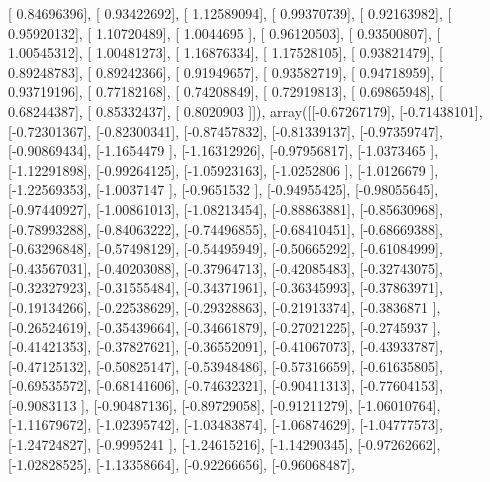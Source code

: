 \documentclass{article}
\begin{document}
       [ 0.84696396],
       [ 0.93422692],
       [ 1.12589094],
       [ 0.99370739],
       [ 0.92163982],
       [ 0.95920132],
       [ 1.10720489],
       [ 1.0044695 ],
       [ 0.96120503],
       [ 0.93500807],
       [ 1.00545312],
       [ 1.00481273],
       [ 1.16876334],
       [ 1.17528105],
       [ 0.93821479],
       [ 0.89248783],
       [ 0.89242366],
       [ 0.91949657],
       [ 0.93582719],
       [ 0.94718959],
       [ 0.93719196],
       [ 0.77182168],
       [ 0.74208849],
       [ 0.72919813],
       [ 0.69865948],
       [ 0.68244387],
       [ 0.85332437],
       [ 0.8020903 ]]), array([[-0.67267179],
       [-0.71438101],
       [-0.72301367],
       [-0.82300341],
       [-0.87457832],
       [-0.81339137],
       [-0.97359747],
       [-0.90869434],
       [-1.1654479 ],
       [-1.16312926],
       [-0.97956817],
       [-1.0373465 ],
       [-1.12291898],
       [-0.99264125],
       [-1.05923163],
       [-1.0252806 ],
       [-1.0126679 ],
       [-1.22569353],
       [-1.0037147 ],
       [-0.9651532 ],
       [-0.94955425],
       [-0.98055645],
       [-0.97440927],
       [-1.00861013],
       [-1.08213454],
       [-0.88863881],
       [-0.85630968],
       [-0.78993288],
       [-0.84063222],
       [-0.74496855],
       [-0.68410451],
       [-0.68669388],
       [-0.63296848],
       [-0.57498129],
       [-0.54495949],
       [-0.50665292],
       [-0.61084999],
       [-0.43567031],
       [-0.40203088],
       [-0.37964713],
       [-0.42085483],
       [-0.32743075],
       [-0.32327923],
       [-0.31555484],
       [-0.34371961],
       [-0.36345993],
       [-0.37863971],
       [-0.19134266],
       [-0.22538629],
       [-0.29328863],
       [-0.21913374],
       [-0.3836871 ],
       [-0.26524619],
       [-0.35439664],
       [-0.34661879],
       [-0.27021225],
       [-0.2745937 ],
       [-0.41421353],
       [-0.37827621],
       [-0.36552091],
       [-0.41067073],
       [-0.43933787],
       [-0.47125132],
       [-0.50825147],
       [-0.53948486],
       [-0.57316659],
       [-0.61635805],
       [-0.69535572],
       [-0.68141606],
       [-0.74632321],
       [-0.90411313],
       [-0.77604153],
       [-0.9083113 ],
       [-0.90487136],
       [-0.89729058],
       [-0.91211279],
       [-1.06010764],
       [-1.11679672],
       [-1.02395742],
       [-1.03483874],
       [-1.06874629],
       [-1.04777573],
       [-1.24724827],
       [-0.9995241 ],
       [-1.24615216],
       [-1.14290345],
       [-0.97262662],
       [-1.02828525],
       [-1.13358664],
       [-0.92266656],
       [-0.96068487],
\end{document}
